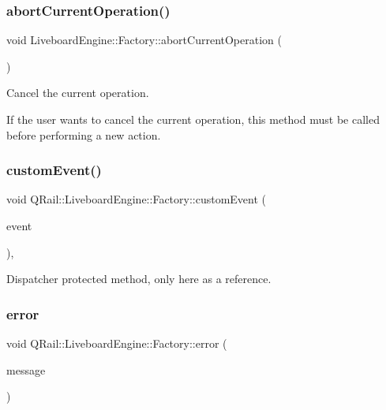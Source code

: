 \subsubsection{\texorpdfstring{abortCurrentOperation()}{abortCurrentOperation()}}
{\footnotesize\ttfamily void Liveboard\+Engine\+::\+Factory\+::abort\+Current\+Operation (\begin{DoxyParamCaption}{ }\end{DoxyParamCaption})}



Cancel the current operation. 

If the user wants to cancel the current operation, this method must be called before performing a new action. \mbox{\label{classQRail_1_1LiveboardEngine_1_1Factory_a214c37703d996797de42151ec41f55b2}} 
\subsubsection{\texorpdfstring{customEvent()}{customEvent()}}
{\footnotesize\ttfamily void Q\+Rail\+::\+Liveboard\+Engine\+::\+Factory\+::custom\+Event (\begin{DoxyParamCaption}\item[{Q\+Event $\ast$}]{event }\end{DoxyParamCaption})\hspace{0.3cm}{\ttfamily [protected]}, {\ttfamily [virtual]}}



Dispatcher protected method, only here as a reference. 

\mbox{\label{classQRail_1_1LiveboardEngine_1_1Factory_a0c8fab5c22d9a46f00afea2fd9224421}} 
\subsubsection{\texorpdfstring{error}{error}}
{\footnotesize\ttfamily void Q\+Rail\+::\+Liveboard\+Engine\+::\+Factory\+::error (\begin{DoxyParamCaption}\item[{const Q\+String \&}]{message }\end{DoxyParamCaption})\hspace{0.3cm}{\ttfamily [signal]}}



